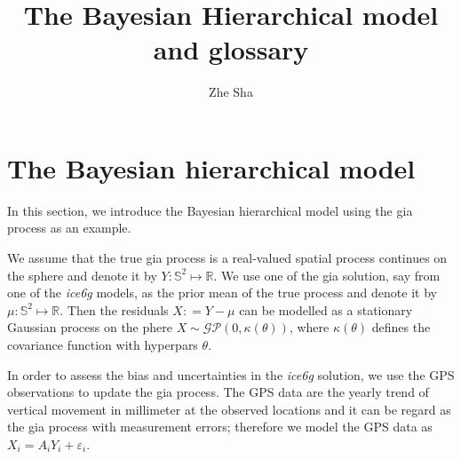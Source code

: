 \documentclass[a4paper,12pt]{article}
\begin{document}
 \title{The Bayesian Hierarchical model and glossary}
\author{Zhe Sha}
\maketitle

\onehalfspacing
{}
\section{The Bayesian hierarchical model}
In this section, we introduce the Bayesian hierarchical model using the \acrshort{gia} process as an example. 

We assume that the true \acrshort{gia} process is a real-valued spatial process continues on the sphere and denote it by $Y: \mathbb{S}^2 \mapsto \mathbb{R}$. We use one of the \acrshort{gia} solution, say from one of the \emph{ice6g} models, as the prior mean of the true process and denote it by $\mu: \mathbb{S}^2 \mapsto \mathbb{R}$. Then the residuals $X: = Y - \mu$ can be modelled as a stationary Gaussian process on the phere $X \sim \mathcal{GP}(0, \kappa(\theta))$, where $\kappa(\theta)$ defines the covariance function with \gls{hyperpars} $\theta$.

In order to assess the bias and uncertainties in the \emph{ice6g} solution, we use the GPS observations to update the \acrshort{gia} process. The GPS   data are the yearly trend of vertical movement in millimeter at the observed locations and it can be regard as the \acrshort{gia} process with measurement errors; therefore we model the GPS data as $X_i = A_iY_i + \varepsilon_i$.



\clearpage
 
\printglossary[type=\acronymtype]
 
\printglossary
 
\end{document}
